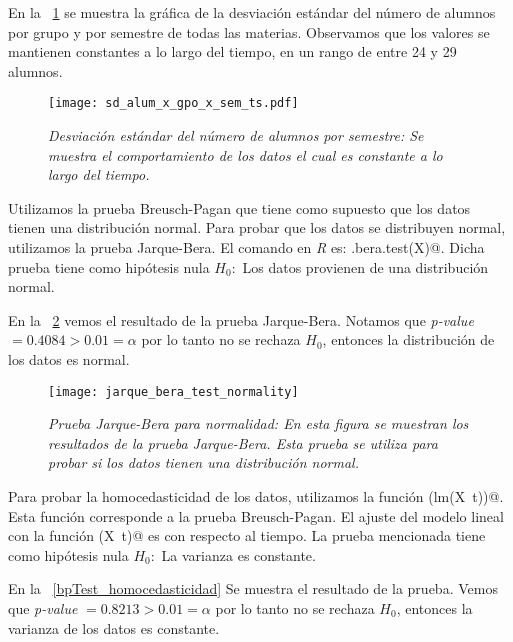 En la \figurename{~\ref{sd_alum_x_gpo_x_sem_ts}} se muestra la gráfica de la desviación estándar del número de alumnos por grupo y por semestre de todas las materias. Observamos que los valores se mantienen constantes a lo largo del tiempo, en un rango de entre 24 y 29 alumnos.


\begin{figure}[H]
\centering
\texttt{[image: sd\_alum\_x\_gpo\_x\_sem\_ts.pdf]} %
\caption[\textit{Desviación estándar del número de alumnos por semestre}]{\textit{Desviación estándar del número de alumnos por semestre: Se muestra el comportamiento de los datos el cual es constante a lo largo del tiempo.}}\label{sd_alum_x_gpo_x_sem_ts}
\end{figure}



Utilizamos la prueba Breusch-Pagan que tiene como supuesto que los datos tienen una distribución normal. Para probar que los datos se distribuyen normal, utilizamos la prueba Jarque-Bera. El comando en \textit{R} es: \verb@jarque.bera.test(X)@. Dicha prueba tiene como hipótesis nula $H_{0}:$ Los datos provienen de una distribución normal.

En la \figurename{~\ref{JarqueBeraTest_normality}} vemos el resultado de la prueba Jarque-Bera. Notamos que \textit{p-value} $ = 0.4084 > 0.01 = \alpha$ por lo tanto no se rechaza $H_{0}$, entonces la distribución de los datos es normal.

\begin{figure}[H]
\centering
\texttt{[image: jarque\_bera\_test\_normality]} %
\caption[\textit{Prueba Jarque-Bera para normalidad}]{\textit{Prueba Jarque-Bera para normalidad: En esta figura se muestran los resultados de la prueba Jarque-Bera. Esta prueba se utiliza para probar si los datos tienen una distribución normal.}}\label{JarqueBeraTest_normality}
\end{figure}


Para probar la homocedasticidad de los datos, utilizamos la función \verb@bptest(lm(X~t))@. Esta función corresponde a la prueba Breusch-Pagan. El ajuste del modelo lineal con la función \verb@lm(X~t)@ es con respecto al tiempo. La prueba mencionada tiene como hipótesis nula $H_{0}:$ La varianza es constante.

En la \figurename{~\ref{bpTest_homocedasticidad}} Se muestra el resultado de la prueba. Vemos que \textit{p-value} $ = 0.8213 > 0.01 = \alpha$ por lo tanto no se rechaza $H_{0}$, entonces la varianza de los datos es constante.


